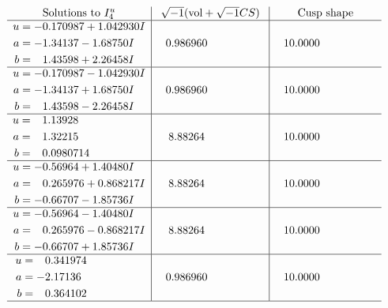 \documentclass[1p]{elsarticle_modified}
\theoremstyle{definition}
\newcommand{\I}{\sqrt{-1}}
\begin{document}
$$\begin{array}{c|c|c}  
\text{Solutions to }I^u_{4}& \I (\text{vol} + \sqrt{-1}CS) & \text{Cusp shape}\\
 \hline 
\begin{aligned}
u &= -0.170987 + 1.042930 I \\
a &= -1.34137 - 1.68750 I \\
b &= \phantom{-}1.43598 + 2.26458 I\end{aligned}
 & \phantom{-}0.986960\phantom{ +0.000000I} & \phantom{-}10.0000\phantom{ +0.000000I} \\ \hline\begin{aligned}
u &= -0.170987 - 1.042930 I \\
a &= -1.34137 + 1.68750 I \\
b &= \phantom{-}1.43598 - 2.26458 I\end{aligned}
 & \phantom{-}0.986960\phantom{ +0.000000I} & \phantom{-}10.0000\phantom{ +0.000000I} \\ \hline\begin{aligned}
u &= \phantom{-}1.13928\phantom{ +0.000000I} \\
a &= \phantom{-}1.32215\phantom{ +0.000000I} \\
b &= \phantom{-}0.0980714\phantom{ +0.000000I}\end{aligned}
 & \phantom{-}8.88264\phantom{ +0.000000I} & \phantom{-}10.0000\phantom{ +0.000000I} \\ \hline\begin{aligned}
u &= -0.56964 + 1.40480 I \\
a &= \phantom{-}0.265976 + 0.868217 I \\
b &= -0.66707 - 1.85736 I\end{aligned}
 & \phantom{-}8.88264\phantom{ +0.000000I} & \phantom{-}10.0000\phantom{ +0.000000I} \\ \hline\begin{aligned}
u &= -0.56964 - 1.40480 I \\
a &= \phantom{-}0.265976 - 0.868217 I \\
b &= -0.66707 + 1.85736 I\end{aligned}
 & \phantom{-}8.88264\phantom{ +0.000000I} & \phantom{-}10.0000\phantom{ +0.000000I} \\ \hline\begin{aligned}
u &= \phantom{-}0.341974\phantom{ +0.000000I} \\
a &= -2.17136\phantom{ +0.000000I} \\
b &= \phantom{-}0.364102\phantom{ +0.000000I}\end{aligned}
 & \phantom{-}0.986960\phantom{ +0.000000I} & \phantom{-}10.0000\phantom{ +0.000000I}\\
 \hline 
 \end{array}$$\newpage
\end{document}
